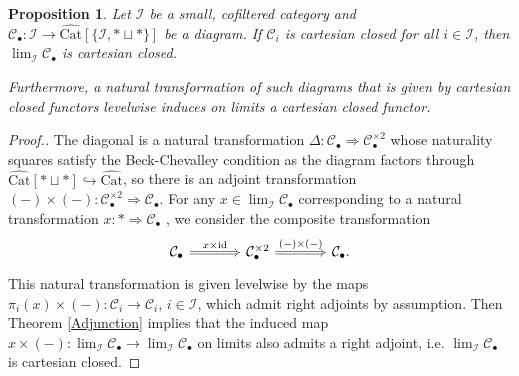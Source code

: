 \documentclass[a4paper,reqno,10pt]{amsart}
\newtheorem{proposition}[theorem]{Proposition}
\theoremstyle{definition}
\theoremstyle{remark}
\newtheorem{example}[theorem]{Example}
\newcommand{\sqb}[1]{\left\lbrack #1\right\rbrack}
\newcommand{\C}{\mathcal{C}}
\newcommand{\I}{\mathcal{I}}
\newcommand{\id}{\operatorname{id}}
\newcommand{\Cat}{\mathrm{Cat}}
\newcommand{\An}{\mathrm{An}}
\newcommand{\Sp}{\mathrm{Sp}}
\begin{document}

\begin{proposition}\label{CartesianClosed}
Let $\I$ be a small, cofiltered category and $\C_{\bullet}\colon\I\rightarrow\widehat{\Cat}\sqb{\{\I,\ast\sqcup\ast\}}$ be a diagram. If $\C_i$ is cartesian closed for all $i\in\I$, then $\lim_{\I}\C_{\bullet}$ is cartesian closed.

Furthermore, a natural transformation of such diagrams that is given by cartesian closed functors levelwise induces on limits a cartesian closed functor.
\end{proposition}
\begin{proof}[Proof.]
The diagonal is a natural transformation $\Delta\colon\C_{\bullet}\Rightarrow\C_{\bullet}^{\times2}$ whose naturality squares satisfy the Beck-Chevalley condition as the diagram factors through $\widehat{\Cat}\sqb{\ast\sqcup\ast}\hookrightarrow\widehat{\Cat}$, so there is an adjoint transformation $(-)\times(-)\colon \C_{\bullet}^{\times2}\Rightarrow \C_{\bullet}$. For any $x\in\lim_{\I}\C_{\bullet}$ corresponding to a natural transformation $x\colon\ast\Rightarrow \C_{\bullet}$
, we consider the composite transformation
\begin{equation*}
\begin{tikzcd}[column sep=large]
\C_{\bullet}\arrow[r,Rightarrow,"x\times\id"] & \C_{\bullet}^{\times2}\arrow[r,Rightarrow,"(-)\times(-)"] & \C_{\bullet}.
\end{tikzcd}
\end{equation*}
This natural transformation is given levelwise by the maps $\pi_i(x)\times(-)\colon\C_i\rightarrow\C_i,\,i\in\I$, which admit right adjoints by assumption. Then Theorem \ref{Adjunction} implies that the induced map $x\times(-)\colon\lim_{\I}\C_{\bullet}\rightarrow\lim_{\I}\C_{\bullet}$ on limits also admits a right adjoint, i.e. $\lim_{\I}\C_{\bullet}$ is cartesian closed.
\end{proof}
\end{document}
